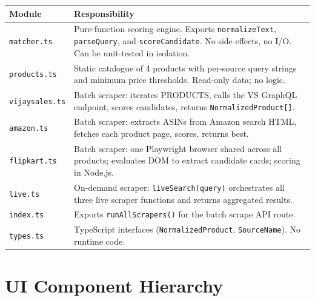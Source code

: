 \documentclass[12pt,a4paper]{report}
\begin{document}
\begin{longtable}{L{3cm} L{10cm}}
  \toprule
  \textbf{Module} & \textbf{Responsibility} \\
  \midrule
  \endhead
  \texttt{matcher.ts} &
    Pure-function scoring engine. Exports \texttt{normalizeText},
    \texttt{parseQuery}, and \texttt{scoreCandidate}. No side effects,
    no I/O. Can be unit-tested in isolation. \\[3pt]
  \texttt{products.ts} &
    Static catalogue of 4 products with per-source query strings and
    minimum price thresholds. Read-only data; no logic. \\[3pt]
  \texttt{vijaysales.ts} &
    Batch scraper: iterates PRODUCTS, calls the VS GraphQL endpoint, scores
    candidates, returns \texttt{NormalizedProduct[]}. \\[3pt]
  \texttt{amazon.ts} &
    Batch scraper: extracts ASINs from Amazon search HTML, fetches each
    product page, scores, returns best. \\[3pt]
  \texttt{flipkart.ts} &
    Batch scraper: one Playwright browser shared across all products;
    evaluates DOM to extract candidate cards; scoring in Node.js. \\[3pt]
  \texttt{live.ts} &
    On-demand scraper: \texttt{liveSearch(query)} orchestrates all three
    live scraper functions and returns aggregated results. \\[3pt]
  \texttt{index.ts} &
    Exports \texttt{runAllScrapers()} for the batch scrape API route. \\[3pt]
  \texttt{types.ts} &
    TypeScript interfaces (\texttt{NormalizedProduct}, \texttt{SourceName}).
    No runtime code. \\
  \bottomrule
\end{longtable}

\section{UI Component Hierarchy}
\end{document}

